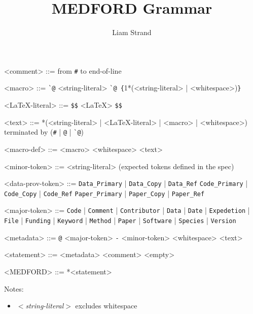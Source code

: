 \documentclass{article}
\begin{document}
\title{MEDFORD Grammar}
\date{}
\author{Liam Strand}
\maketitle

\setlength{\grammarindent}{10em} %

\newcommand{\ttt}[1]{\texttt{#1}}

\begin{grammar}

<comment> ::= from \ttt{\#} to end-of-line

<macro> ::= \ttt{\`{}@} <string-literal>
\alt \ttt{\`{}@ \{}1*(<string-literal> | <whitespace>)\ttt{\}}

<\LaTeX-literal> ::= \ttt{\$\$} <\LaTeX> \ttt{\$\$}

<text> ::= *(<string-literal> | <\LaTeX-literal> | <macro> | <whitespace>) 
terminated by (\ttt{\#} | \ttt{@} | \ttt{\`{}@})

<macro-def> ::= <macro> <whitespace> <text>

<minor-token> ::= <string-literal> (expected tokens defined in the spec)

<data-prov-token> ::= \ttt{Data\_Primary} | \ttt{Data\_Copy} | \ttt{Data\_Ref}
\alt \ttt{Code\_Primary} | \ttt{Code\_Copy} | \ttt{Code\_Ref}
\alt \ttt{Paper\_Primary} | \ttt{Paper\_Copy} | \ttt{Paper\_Ref}

<major-token> ::= \ttt{Code} | \ttt{Comment} | \ttt{Contributor} | \ttt{Data} | \ttt{Date} | \ttt{Expedetion} | \ttt{File} | \ttt{Funding} | \ttt{Keyword} | \ttt{Method} | \ttt{Paper} | \ttt{Software} | \ttt{Species} | \ttt{Version}

<metadata> ::= \ttt{@} <major-token> \ttt{-} <minor-token> <whitespace> <text>

<statement> ::= <metadata>
\alt <comment>
\alt <empty>

<MEDFORD> ::= *<statement>

\end{grammar}

\bigskip

Notes: 
\begin{itemize}
    \item \textit{\(<\)string-literal\(>\)} excludes whitespace
\end{itemize}

%  




\end{document}
